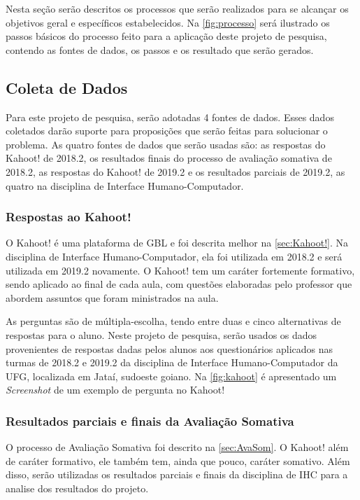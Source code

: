 \documentclass[
	12pt,				%
	openright,			%
	oneside,
	a4paper,			%
	english,			%
	french,				%
	spanish,			%
	brazil,				%
	]{abntex2}
\begin{document}
Nesta seção serão descritos os processos que serão realizados para se alcançar os objetivos geral e específicos estabelecidos. Na \autoref{fig:processo} será ilustrado os passos básicos do processo feito para a aplicação deste projeto de pesquisa, contendo as fontes de dados, os passos e os resultado que serão gerados.

\subsection{Coleta de Dados}
Para este projeto de pesquisa, serão adotadas 4 fontes de dados. Esses dados coletados darão suporte para proposições que serão feitas para solucionar o problema. As quatro fontes de dados que serão usadas são: as respostas do Kahoot! de 2018.2, os resultados finais do processo de avaliação somativa de 2018.2, as respostas do Kahoot! de 2019.2 e os resultados parciais de 2019.2, as quatro na disciplina de Interface Humano-Computador.

\subsubsection{Respostas ao Kahoot!}
O Kahoot! é uma plataforma de GBL e foi descrita melhor na \autoref{sec:Kahoot!}. Na disciplina de Interface Humano-Computador, ela foi utilizada em 2018.2 e será utilizada em 2019.2 novamente. O Kahoot! tem um caráter fortemente formativo, sendo aplicado ao final de cada aula, com questões elaboradas pelo professor que abordem assuntos que foram ministrados na aula. 

As perguntas são de múltipla-escolha, tendo entre duas e cinco alternativas de respostas para o aluno. Neste projeto de pesquisa, serão usados os dados provenientes de respostas dadas pelos alunos aos questionários aplicados nas turmas de 2018.2 e 2019.2 da disciplina de Interface Humano-Computador da UFG, localizada em Jataí, sudoeste goiano. Na \autoref{fig:kahoot} é apresentado um \textit{Screenshot} de um exemplo de pergunta no Kahoot!

\subsubsection{Resultados parciais e finais da Avaliação Somativa}

O processo de Avaliação Somativa foi descrito na \autoref{sec:AvaSom}. O Kahoot! além de caráter formativo, ele também tem, ainda que pouco, caráter somativo. Além disso, serão utilizadas os resultados parciais e finais da disciplina de IHC para a analise dos resultados do projeto.
\end{document}
